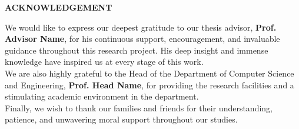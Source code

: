 \begin{center}
    \vspace*{1.0cm}
    {\large \bfseries ACKNOWLEDGEMENT}\\[1.5cm]
\end{center}

\noindent We would like to express our deepest gratitude to our thesis advisor, \textbf{Prof. Advisor Name}, for his continuous support, encouragement, and invaluable guidance throughout this research project. His deep insight and immense knowledge have inspired us at every stage of this work.\\[0.5cm]

\noindent We are also highly grateful to the Head of the Department of Computer Science and Engineering, \textbf{Prof. Head Name}, for providing the research facilities and a stimulating academic environment in the department.\\[0.5cm]

\noindent Finally, we wish to thank our families and friends for their understanding, patience, and unwavering moral support throughout our studies.
